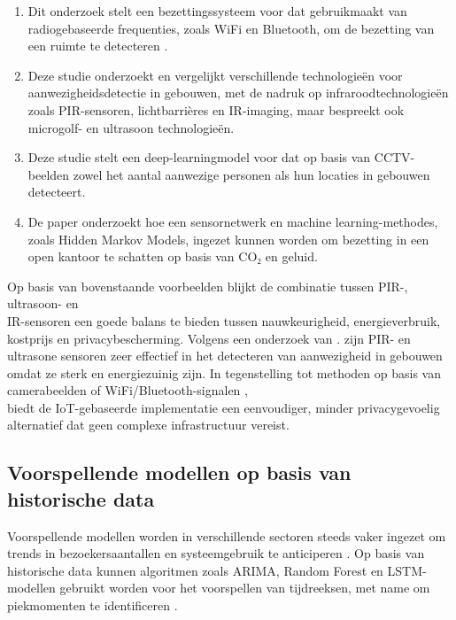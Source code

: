 \begin{enumerate}
    \item Dit onderzoek stelt een bezettingssysteem voor dat gebruikmaakt van radiogebaseerde frequenties, zoals WiFi en Bluetooth, om de bezetting van een ruimte te detecteren \autocite{Shahbazian2023}.
    
    \item Deze studie onderzoekt en vergelijkt verschillende technologieën voor aanwezigheidsdetectie in gebouwen, met de nadruk op infraroodtechnologieën zoals PIR-sensoren, lichtbarrières en IR-imaging, maar bespreekt ook microgolf- en ultrasoon technologieën. \\ \autocite{Maaspuro2018}
    
    \item Deze studie stelt een deep-learningmodel voor dat op basis van CCTV-beelden zowel het aantal aanwezige personen als hun locaties in gebouwen detecteert. \autocite{Hu2023}
    
    \item De paper onderzoekt hoe een sensornetwerk en machine learning-methodes, zoals Hidden Markov Models, ingezet kunnen worden om bezetting in een open kantoor te schatten op basis van CO₂ en geluid. \autocite{Lam2009}
\end{enumerate}

Op basis van bovenstaande voorbeelden blijkt de combinatie tussen PIR-, ultrasoon- en \\ IR-sensoren een goede balans te bieden tussen nauwkeurigheid, energieverbruik, kostprijs en privacybescherming. Volgens een onderzoek van \autocite{Maaspuro2018}. zijn PIR- en ultrasone sensoren zeer effectief in het detecteren van aanwezigheid in gebouwen omdat ze sterk en energiezuinig zijn. In tegenstelling tot methoden op basis van camerabeelden of WiFi/Bluetooth-signalen \autocite{Hu2023, Shahbazian2023}, \\ biedt de IoT-gebaseerde implementatie een eenvoudiger, minder privacygevoelig alternatief dat geen complexe infrastructuur vereist.


\subsection{Voorspellende modellen op basis van historische data}
Voorspellende modellen worden in verschillende sectoren steeds vaker ingezet om trends in bezoekersaantallen en systeemgebruik te anticiperen \autocite{Ejstrud2006}. Op basis van historische data kunnen algoritmen zoals ARIMA, Random Forest en LSTM-modellen gebruikt worden voor het voorspellen van tijdreeksen, met name om piekmomenten te identificeren \autocite{Park_2024}. 

